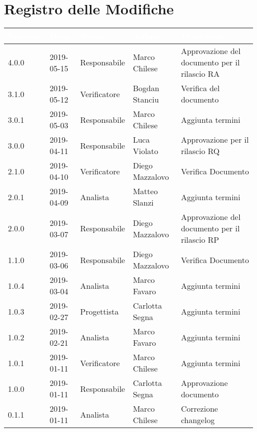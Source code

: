 \section*{Registro delle Modifiche}

\begin{center}
\begin{longtable}[c]{|m{}|m{}|m{}|m{}|p{}|}
\hline
\rowcolor{bluelogo}\textbf{\textcolor{white}{Versione}} & \textbf{\textcolor{white}{Data}} & \textbf{\textcolor{white}{Ruolo}} & \textbf{\textcolor{white}{Autore}} & \textbf{\textcolor{white}{Descrizione}} \\
\hline \hline
\endhead

\rowcolor{grigio}4.0.0 & 2019-05-15 & Responsabile & Marco Chilese & Approvazione del documento per il rilascio RA\\
\hline
3.1.0 & 2019-05-12 & Verificatore & Bogdan Stanciu & Verifica del documento\\
\hline
\rowcolor{grigio}3.0.1 & 2019-05-03 & Responsabile & Marco Chilese & Aggiunta termini\\
\hline
3.0.0 & 2019-04-11 & Responsabile & Luca Violato & Approvazione per il rilascio RQ \\
\hline
\rowcolor{grigio}2.1.0 & 2019-04-10 & Verificatore & Diego Mazzalovo & Verifica Documento \\
\hline
2.0.1 & 2019-04-09 & Analista & Matteo Slanzi & Aggiunta termini \\
\hline
\rowcolor{grigio}2.0.0 & 2019-03-07 & Responsabile & Diego Mazzalovo & Approvazione del documento per il rilascio RP \\
\hline 
1.1.0 & 2019-03-06 & Responsabile & Diego Mazzalovo & Verifica Documento \\
\hline
\rowcolor{grigio}1.0.4 & 2019-03-04 & Analista & Marco Favaro & Aggiunta termini \\
\hline
1.0.3 & 2019-02-27 & Progettista & Carlotta Segna & Aggiunta termini \\
\hline
\rowcolor{grigio}1.0.2 & 2019-02-21 & Analista & Marco Favaro & Aggiunta termini\\
\hline
1.0.1 & 2019-01-11 & Verificatore & Marco Chilese & Aggiunta termini\\
\hline
\rowcolor{grigio}1.0.0 & 2019-01-11 & Responsabile & Carlotta Segna & Approvazione documento \\
\hline
0.1.1 & 2019-01-11 & Analista & Marco Chilese & Correzione changelog\\

\end{longtable}
\end{center}
